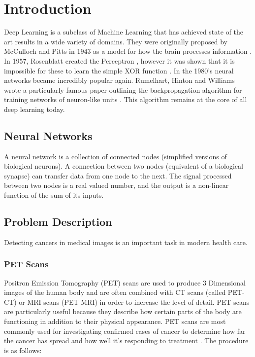 
\chapter{Introduction}\label{cha:introduction}

Deep Learning is a subclass of Machine Learning that has achieved state of the art results in a wide variety of domains.
They were originally proposed by McCulloch and Pitts in 1943 as a model for how the brain processes information \cite{McCulloch_Pitts_1943}.
In 1957, Rosenblatt created the Perceptron \cite{Rosenblatt_1957, Rosenblatt_1958}, however it was shown that it is impossible for these to learn the simple XOR function \cite{Minsky_Papert_1988}.
In the 1980's neural networks became incredibly popular again.
Rumelhart, Hinton and Williams wrote a particularly famous paper outlining the backpropagation algorithm for training networks of neuron-like units \cite{Rumelhart_Hinton_Williams_1986}.
This algorithm remains at the core of all deep learning today.


\section{Neural Networks}\label{sec:neural_network_int}
A neural network is a collection of connected nodes (simplified versions of  biological neurons).
A connection between two nodes (equivalent of a biological synapse) can transfer data from one node to the next.
The signal processed between two nodes is a real valued number, and the output is a non-linear function of the sum of its inputs.

\section{Problem Description}\label{sec:problem_description_int}
Detecting cancers in medical images is an important task in modern health care.

\subsection{PET Scans}\label{subsec:pet_scan_int}
Positron Emission Tomography (PET) scans are used to produce 3 Dimensional images of the human body and are often combined with CT scans (called PET-CT) or MRI scans (PET-MRI) in order to increase the level of detail.
PET scans are particularly useful because they describe how certain parts of the body are functioning in addition to their physical appearance.
PET scans are most commonly used for investigating confirmed cases of cancer to determine how far the cancer has spread and how well it's responding to treatment \cite{Radiology_ACR, PET_scan}.
The procedure is as follows:

